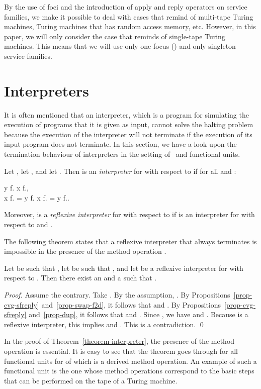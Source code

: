 \documentclass[fleqn]{llncs}
\begin{document}
By the use of foci and the introduction of apply and reply operators on
service families, we make it possible to deal with cases that remind of
multi-tape Turing machines, Turing machines that has random access
memory, etc.
However, in this paper, we will only consider the case that reminds of
single-tape Turing machines.
This means that we will use only one focus () and only
singleton service families.

\section{Interpreters}
\label{sect-interpreters}

It is often mentioned that an interpreter, which is a program for
simulating the execution of programs that it is given as input, cannot
solve the halting problem because the execution of the interpreter will
not terminate if the execution of its input program does not terminate.
In this section, we have a look upon the termination behaviour of
interpreters in the setting of \PGLBbt\ and functional units.

Let , let , and
let .
Then  is an \emph{interpreter} for  with respect
to  if for all  and :
\begin{ldispl}
y \cvg f. \Implies
x \cvg f.\;, \\
x \sfapply f. =
y \sfapply f.\; \;
x \sfreply f. =
y \sfreply f.\;.
\end{ldispl}
Moreover,  is a \emph{reflexive interpreter} for 
with respect to  if  is an interpreter for  with respect
to  and .

The following theorem states that a reflexive interpreter that always
terminates is impossible in the presence of the method operation .
\begin{theorem}
\label{theorem-interpreter}
Let  be such that ,
let  be such that , and
let  be a reflexive interpreter for  with
respect to .
Then there exist an  and a 
such that .
\end{theorem}
\begin{proof}
Assume the contrary.
Take .
By the assumption, .
By Propositions~\ref{prop-cvg-sfreply} and~\ref{prop-swap-f2d}, it
follows that 
and
.
By Propositions~\ref{prop-cvg-sfreply} and~\ref{prop-dup}, it follows
that  and
.
Since , we have
 and
.
Because  is a reflexive interpreter, this implies
 and
.
This is a contradiction.
\qed
\end{proof}
In the proof of Theorem~\ref{theorem-interpreter}, the presence of the
method operation  is essential.
It is easy to see that the theorem goes through for all functional units
for  of which  is a derived method operation.
An example of such a functional unit is the one whose method operations
correspond to the basic steps that can be performed on the tape of a
Turing machine.
\end{document}
